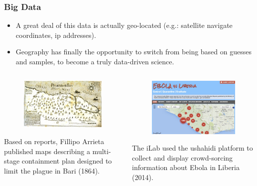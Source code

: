 \documentclass[hyperref={pdfpagelabels=true}]{beamer}
\begin{document}
\begin{frame}
\frametitle{Big Data}
\small{
    \begin{itemize}
      \item<2->A great deal of this data is actually geo-located (e.g.: satellite navigate coordinates, ip addresses). %
      \item<3->Geography has finally the opportunity to switch from being based on guesses and samples, to become a truly data-driven science.
      \end{itemize}
}

\begin{columns}
  \begin{column}{0.5\textwidth}
      \begin{figure}       
	\includegraphics[width=\textwidth]{old_map.png}      
     \end{figure}
    \tiny{Based on reports, Fillipo Arrieta published maps describing a multi-stage containment plan designed to limit the plague in Bari (1864).}
  \end{column}
  \begin{column}{0.5\textwidth}
    \begin{figure}       
	\includegraphics[width=\textwidth]{ebola_ushahidi.jpg}      
     \end{figure}
    \tiny{The iLab used the ushahidi platform to collect and display crowd-sorcing information about Ebola in Liberia (2014).}  
  \end{column}  
\end{columns}


\end{frame}
\end{document}
